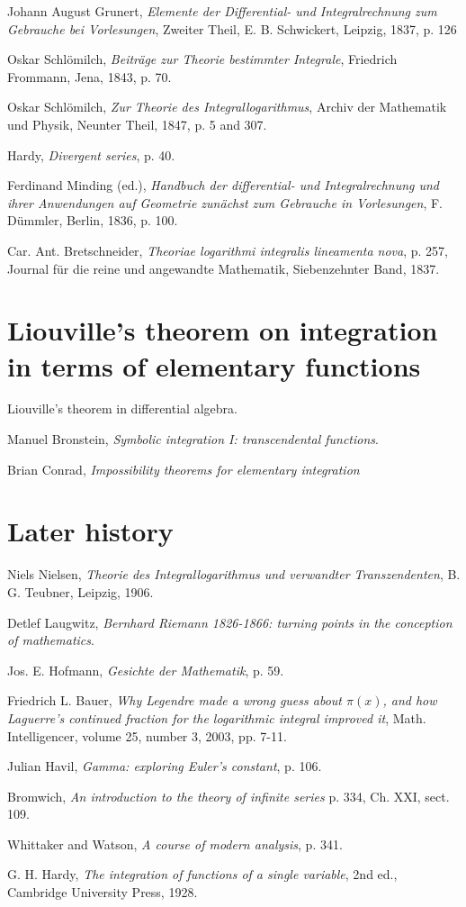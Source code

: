 \documentclass{article}
\begin{document}
Johann August Grunert,
{\em Elemente der Differential- und Integralrechnung zum Gebrauche
bei Vorlesungen}, Zweiter Theil, E. B. Schwickert, Leipzig, 1837,
p. 126

Oskar Schl\"omilch, {\em Beitr\"age zur Theorie bestimmter Integrale},
Friedrich Frommann, Jena, 1843, p. 70.

Oskar Schl\"omilch, {\em Zur Theorie des Integrallogarithmus},
Archiv der Mathematik und Physik,
Neunter Theil, 1847, p. 5 and 307.

Hardy, {\em Divergent series}, p. 40.

Ferdinand Minding (ed.), {\em Handbuch der differential- und Integralrechnung
und ihrer Anwendungen auf Geometrie zun\"achst zum Gebrauche in Vorlesungen},
F. D\"ummler, Berlin, 1836, p. 100.

Car. Ant. Bretschneider, {\em Theoriae logarithmi integralis lineamenta nova},
p. 257,
Journal f\"ur die reine und angewandte Mathematik, 
Siebenzehnter Band, 1837.

\section{Liouville's theorem on integration in terms of elementary functions}
Liouville's theorem in differential algebra.

Manuel Bronstein, {\em Symbolic integration I: transcendental functions}.

Brian Conrad, {\em Impossibility theorems for elementary integration}

\section{Later history}
Niels Nielsen, {\em Theorie des Integrallogarithmus und verwandter
Transzendenten}, B. G. Teubner, Leipzig, 1906.

Detlef Laugwitz, {\em Bernhard Riemann 1826-1866: turning points in the
conception of mathematics}.

Jos. E. Hofmann, {\em Gesichte der Mathematik}, p. 59.

Friedrich L. Bauer, {\em Why Legendre made a wrong guess about $\pi(x)$, and
how Laguerre's continued fraction for the logarithmic integral improved it},
Math. Intelligencer, volume 25, number 3, 2003, pp. 7-11.

Julian Havil, {\em Gamma: exploring Euler's constant}, p. 106.

Bromwich,
{\em An introduction to the theory of infinite series}
p. 334, Ch. XXI, sect. 109.

Whittaker and Watson, {\em A course of modern analysis}, p. 341.

G. H. Hardy,
{\em The integration of functions of a single variable},
2nd ed., Cambridge University Press, 1928.
\end{document}
